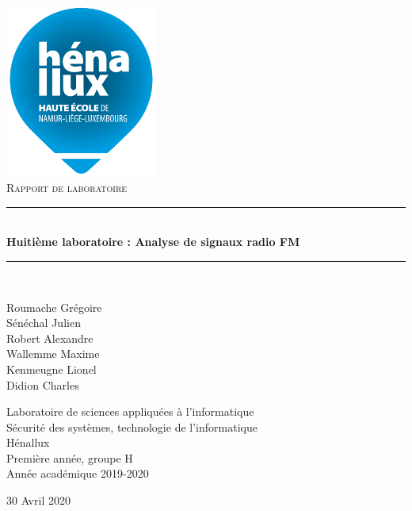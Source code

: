 \documentclass[a4paper]{article}
\newcommand{\HRule}{\rule{\linewidth}{0.5mm}}
\begin{document}
\begin{titlepage}
    \begin{sffamily}
        \begin{center}
            \includegraphics[width=5cm]{images/LogoHenallux.PNG}~\\[1.5cm]
            \textsc{\Large Rapport de laboratoire}\\[1.5cm]

            \HRule \\[0.4cm]
            { \huge \bfseries Huitième laboratoire : Analyse de signaux radio FM\\[0.4cm] }
            \HRule \\[2cm]

            \begin{minipage}{0.4\textwidth}
                \begin{flushleft} \large
                    Roumache Grégoire\\
                    Sénéchal Julien\\
                    Robert Alexandre\\
                    Wallemme Maxime\\
                    Kenmeugne Lionel\\
                    Didion Charles
                \end{flushleft}
            \end{minipage}
            \begin{minipage}{0.55\textwidth}
                \begin{flushright} \large
                    Laboratoire de sciences appliquées à l'informatique\\
                    Sécurité des systèmes, technologie de l'informatique\\
                    Hénallux\\
                    Première année, groupe H \\
                    Année académique 2019-2020\\
                \end{flushright}
            \end{minipage}
            \vfill

            {\large 30 Avril 2020}
        \end{center}
    \end{sffamily}
\end{titlepage}
\end{document}
